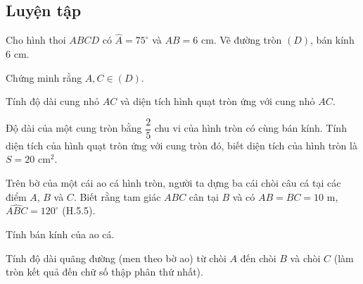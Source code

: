 \begin{practice}
    \subsection{Luyện tập}

    \begin{questions}[resume=SBT]
        \item Cho hình thoi $ABCD$ có $\widehat{A}=75^\circ$ và $AB=6$ cm. Vẽ đường tròn $(D)$, bán kính 6 cm.
        \begin{questions}
            \item Chứng minh rằng $A,C\in(D)$.

            \answerline
            \answerline

            \item Tính độ dài cung nhỏ $AC$ và diện tích hình quạt tròn ứng với cung nhỏ $AC$.

            \answerline
            \answerline
            \answerline
        \end{questions}

        \item Độ dài của một cung tròn bằng $\dfrac{2}{5}$ chu vi của hình tròn có cùng bán kính. Tính diện tích của hình quạt tròn ứng với cung tròn đó, biết diện tích của hình tròn là $S=20$ cm$^2$.

        \answerline
        \answerline

        \item Trên bờ của một cái ao cá hình tròn, người ta dựng ba cái chòi câu cá tại các điểm $A$, $B$ và $C$. Biết rằng tam giác $ABC$ cân tại $B$ và có $AB=BC=10$ m, $\widehat{ABC}=120^\circ$ (H.5.5).
        \begin{questions}
            \item Tính bán kính của ao cá.

            \answerline
            \answerline

            \item Tính độ dài quãng đường (men theo bờ ao) từ chòi $A$ đến chòi $B$ và chòi $C$ (làm tròn kết quả đến chữ số thập phân thứ nhất).

            \answerline
            \answerline
            \answerline
        \end{questions}

        \begin{center}


\end{center}
\end{questions}
\end{practice}
